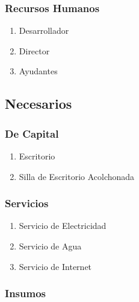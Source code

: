 	 	\subsubsection{Recursos Humanos}
	 	\begin{enumerate}
		\item Desarrollador
		\item Director
		\item Ayudantes	 	
	 	\end{enumerate}
	 	
	 	
	 \subsection{Necesarios}

		\subsubsection{De Capital}
		\begin{enumerate}
		\item Escritorio
		\item Silla de Escritorio Acolchonada %
		\end{enumerate}			 

	 	 \subsubsection{Servicios}
		 \begin{enumerate}
	 
		\item Servicio de Electricidad
		\item Servicio de Agua
		\item Servicio de Internet
	 
		 \end{enumerate}

		\subsubsection{Insumos}
		
